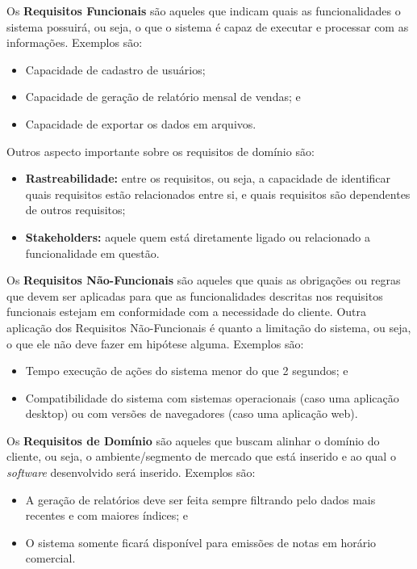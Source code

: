 \documentclass[a4paper,12pt]{article}
\begin{document}
\vspace{1cm}
Os \textbf{Requisitos Funcionais} são aqueles que indicam quais as funcionalidades o sistema possuirá, ou seja, o que o sistema 
é capaz de executar e processar com as informações. Exemplos são:
\begin{itemize}
	\item Capacidade de cadastro de usuários;
	\item Capacidade de geração de relatório mensal de vendas; e
	\item Capacidade de exportar os dados em arquivos.
\end{itemize}
Outros aspecto importante sobre os requisitos de domínio são: 
\begin{itemize}
	\item\textbf{Rastreabilidade:} entre os requisitos, ou seja, a capacidade de identificar quais requisitos estão 
	relacionados entre si, e quais requisitos são dependentes de outros requisitos;
	\item\textbf{Stakeholders:} aquele quem está diretamente ligado ou relacionado a funcionalidade em questão.
\end{itemize}


Os \textbf{Requisitos Não-Funcionais} são aqueles que quais as obrigações ou regras que devem ser aplicadas para que as 
funcionalidades descritas nos requisitos funcionais estejam em conformidade com a necessidade do cliente.
Outra aplicação dos Requisitos Não-Funcionais é quanto a limitação do sistema, ou seja, o que ele não deve fazer 
em hipótese alguma. Exemplos são:
\begin{itemize}
	\item Tempo execução de ações do sistema menor do que 2 segundos; e
	\item Compatibilidade do sistema com sistemas operacionais (caso uma aplicação desktop) ou com versões de 
	navegadores (caso uma aplicação web).
\end{itemize}

\vspace{1cm}
Os \textbf{Requisitos de Domínio} são aqueles que buscam alinhar o domínio do cliente, ou seja, o ambiente/segmento de 
mercado que está inserido e ao qual o \textit{software} desenvolvido será inserido. Exemplos são:
\begin{itemize}
	\item A geração de relatórios deve ser feita sempre filtrando pelo dados mais recentes e com maiores índices; e
	\item O sistema somente ficará disponível para emissões de notas em horário comercial.
\end{itemize}
\end{document}
